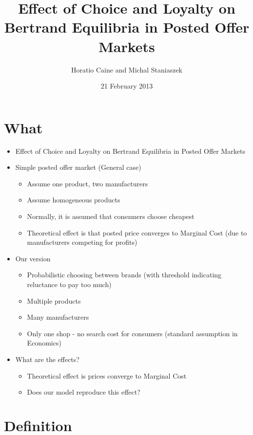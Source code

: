 \documentclass[11pt]{article}
\title{Effect of Choice and Loyalty on Bertrand Equilibria in Posted Offer Markets}
\author{Horatio Caine and Michal Staniaszek}
\date{21 February 2013}
\begin{document}
\maketitle


\section{What}
\label{sec-1}

\begin{itemize}
\item Effect of Choice and Loyalty on Bertrand Equilibria in Posted Offer Markets
\item Simple posted offer market (General case)

\begin{itemize}
\item Assume one product, two manufacturers
\item Assume homogeneous products
\item Normally, it is assumed that consumers choose cheapest
\item Theoretical effect is that posted price converges to Marginal Cost (due to manufacturers competing for profits)
\end{itemize}

\item Our version

\begin{itemize}
\item Probabilistic choosing between brands (with threshold indicating reluctance to pay too much)
\item Multiple products
\item Many manufacturers
\item Only one shop - no search cost for consumers (standard assumption in Economics)
\end{itemize}

\item What are the effects?

\begin{itemize}
\item Theoretical effect is prices converge to Marginal Cost
\item Does our model reproduce this effect?
\end{itemize}

\end{itemize}
\section{Definition}
\label{sec-2}
\end{document}
